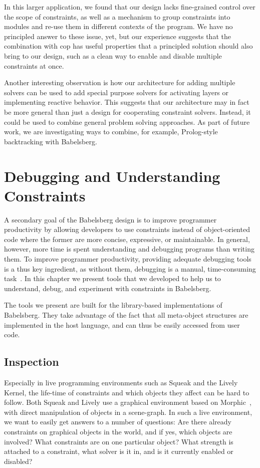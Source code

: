 \SummarySep

In this larger application, we found that our design lacks fine-grained control
over the scope of constraints, as well as a mechanism to group constraints into
modules and re-use them in different contexts of the program. We have no
principled answer to these issue, yet, but our experience suggests that the
combination with \acrlong{cop} has useful properties that a principled solution
should also bring to our design, such as a clean way to enable and disable
multiple constraints at once.

Another interesting observation is how our architecture for adding multiple
solvers can be used to add special purpose solvers for activating layers or
implementing reactive behavior. This suggests that our architecture may in fact
be more general than just a design for cooperating constraint solvers. Instead,
it could be used to combine general problem solving approaches. As part of
future work, we are investigating ways to combine, for example, Prolog-style
backtracking with Babelsberg.

\chapter{Debugging and Understanding Constraints}
\label{chap:tools}

A secondary goal of the Babelsberg design is to improve programmer productivity
by allowing developers to use constraints instead of object-oriented code where
the former are more concise, expressive, or maintainable. In general, however,
more time is spent understanding and debugging programs than writing them. To
improve programmer productivity, providing adequate debugging tools is a thus
key ingredient, as without them, debugging is a manual, time-consuming
task~\cite{Dinning1990}. In this chapter we present tools that we developed to
help us to understand, debug, and experiment with constraints in Babelsberg.

The tools we present are built for the library-based implementations of
Babelsberg. They take advantage of the fact that all meta-object structures are
implemented in the host language, and can thus be easily accessed from user
code.

\section{Inspection}
\label{sec:introspection}

Especially in live programming environments such as Squeak and the Lively
Kernel, the life-time of constraints and which objects they affect can be hard
to follow. Both Squeak and Lively use a graphical environment based on
Morphic~\cite{Maloney:1995:morphic}, with direct manipulation of objects in a
scene-graph. In such a live environment, we want to easily get answers to a
number of questions: Are there already constraints on graphical objects in the
world, and if yes, which objects are involved? What constraints are on one
particular object? What strength is attached to a constraint, what solver is it
in, and is it currently enabled or disabled?

